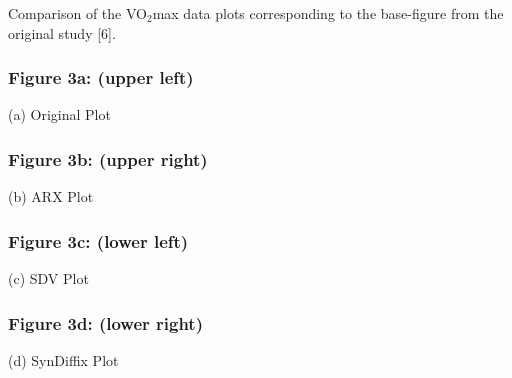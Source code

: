 \documentclass[10pt]{article}
\newcommand{\mycite}[1]{[#1]}
\begin{document}
Comparison of the VO$_2$max data plots corresponding to the base-figure from the original study \mycite{6}.

\subsubsection*{Figure 3a: (upper left)}

(a) Original Plot


\subsubsection*{Figure 3b: (upper right)}

(b) ARX Plot

\subsubsection*{Figure 3c: (lower left)}

(c) SDV Plot

\subsubsection*{Figure 3d: (lower  right)}

(d) SynDiffix Plot
\end{document}

